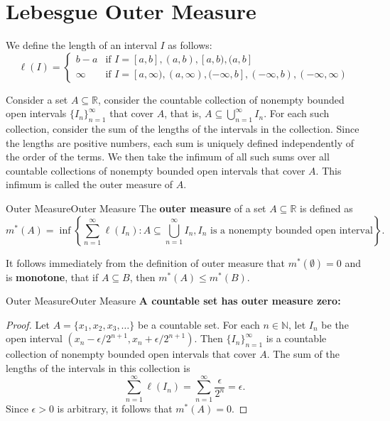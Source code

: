 \documentclass[../main.tex]{subfiles}
\begin{document}
\section{Lebesgue Outer Measure}
We define the length of an interval $I$ as follows:
\begin{equation}
  \ell(I) = \begin{cases}
    b - a & \text{if } I = [a, b], (a, b), [a, b), (a, b] \\
    \infty & \text{if } I = [a, \infty), (a, \infty), (-\infty, b], (-\infty, b), (-\infty, \infty)
  \end{cases}
\end{equation}

Consider a set $A \subseteq \mathbb{R}$, consider the countable collection of nonempty bounded open intervals $\{I_n\}_{n=1}^{\infty}$ that cover $A$, that is, $A \subseteq \bigcup_{n=1}^{\infty} I_n$. For each such collection, consider the sum of the lengths of the intervals in the collection. Since the lengths are positive numbers, each sum is uniquely defined independently of the order of the terms. We then take the infimum of all such sums over all countable collections of nonempty bounded open intervals that cover $A$. This infimum is called the outer measure of $A$.

\begin{definition}{Outer Measure}{Outer Measure}
  The \textbf{outer measure} of a set $A \subseteq \mathbb{R}$ is defined as
  \begin{equation}
    m^*(A) = \inf\left\{\sum_{n=1}^{\infty} \ell(I_n) : A \subseteq \bigcup_{n=1}^{\infty} I_n, I_n \text{ is a nonempty bounded open interval}\right\}.
  \end{equation}
\end{definition}

It follows immediately from the definition of outer measure that $m^*(\emptyset) = 0$ and is \textbf{monotone}, that if $A \subseteq B$, then $m^*(A) \leq m^*(B)$.

\begin{example}{Outer Measure}{Outer Measure}
  \textbf{A countable set has outer measure zero:}

  \begin{proof}
    Let $A = \{x_1, x_2, x_3, \ldots\}$ be a countable set. For each $n \in \mathbb{N}$, let $I_n$ be the open interval $(x_n - \epsilon/2^{n+1}, x_n + \epsilon/2^{n+1})$. Then $\{I_n\}_{n=1}^{\infty}$ is a countable collection of nonempty bounded open intervals that cover $A$. The sum of the lengths of the intervals in this collection is
    \begin{equation}
      \sum_{n=1}^{\infty} \ell(I_n) = \sum_{n=1}^{\infty} \frac{\epsilon}{2^n} = \epsilon.
    \end{equation}
    Since $\epsilon > 0$ is arbitrary, it follows that $m^*(A) = 0$.
  \end{proof}
\end{example}
\end{document}
